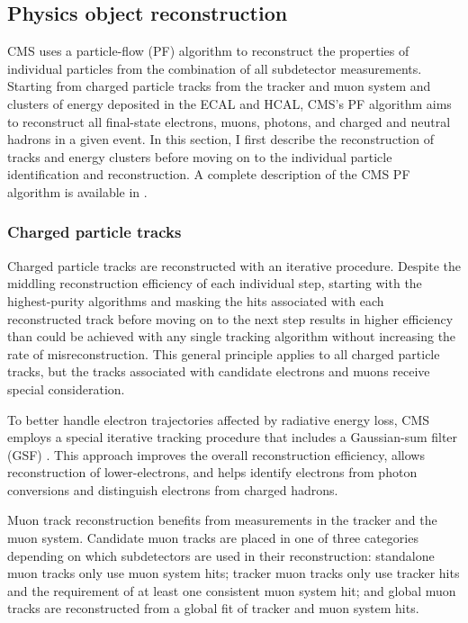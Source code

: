 \subsection{Physics object reconstruction}
CMS uses a particle-flow (PF) algorithm to reconstruct the properties of individual particles from the combination of all subdetector measurements. Starting from charged particle tracks from the tracker and muon system and clusters of energy deposited in the ECAL and HCAL, CMS's PF algorithm aims to reconstruct all final-state electrons, muons, photons, and charged and neutral hadrons in a given event. In this section, I first describe the reconstruction of tracks and energy clusters before moving on to the individual particle identification and reconstruction. A complete description of the CMS PF algorithm is available in \cite{cms_pf}.

\subsubsection{Charged particle tracks}
Charged particle tracks are reconstructed with an iterative procedure. Despite the middling reconstruction efficiency of each individual step, starting with the highest-purity algorithms and masking the hits associated with each reconstructed track before moving on to the next step results in higher efficiency than could be achieved with any single tracking algorithm without increasing the rate of misreconstruction. This general principle applies to all charged particle tracks, but the tracks associated with candidate electrons and muons receive special consideration.

To better handle electron trajectories affected by radiative energy loss, CMS employs a special iterative tracking procedure that includes a Gaussian-sum filter (GSF) \cite{gsf}. This approach improves the overall reconstruction efficiency, allows reconstruction of lower-\pt electrons, and helps identify electrons from photon conversions and distinguish electrons from charged hadrons.

Muon track reconstruction benefits from measurements in the tracker and the muon system. Candidate muon tracks are placed in one of three categories depending on which subdetectors are used in their reconstruction: standalone muon tracks only use muon system hits; tracker muon tracks only use tracker hits and the requirement of at least one consistent muon system hit; and global muon tracks are reconstructed from a global fit of tracker and muon system hits.

